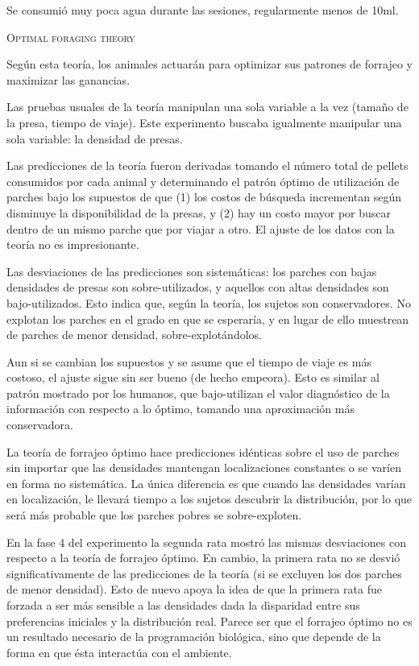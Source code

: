 \documentclass[a4paper,12pt]{article}
\begin{document}
Se consumió muy poca agua durante las sesiones, regularmente menos de 10ml. 

{\scshape Optimal foraging theory}

Según esta teoría, los animales actuarán para optimizar sus patrones de forrajeo y maximizar las ganancias. 

Las pruebas usuales de la teoría manipulan una sola variable a la vez (tamaño de la presa, tiempo de viaje). Este experimento buscaba igualmente manipular una sola variable: la densidad de presas.

Las predicciones de la teoría fueron derivadas tomando el número total de pellets consumidos por cada animal y determinando el patrón óptimo de utilización de parches bajo los supuestos de que (1) los costos de búsqueda incrementan según disminuye la disponibilidad de la presas, y (2) hay un costo mayor por buscar dentro de un mismo parche que por viajar a otro. El ajuste de los datos con la teoría no es impresionante.

Las desviaciones de las predicciones son sistemáticas: los parches con bajas densidades de presas son sobre-utilizados, y aquellos con altas densidades son bajo-utilizados. Esto indica que, según la teoría, los sujetos son conservadores. No explotan los parches en el grado en que se esperaría, y en lugar de ello muestrean de parches de menor densidad, sobre-explotándolos. 

Aun si se cambian los supuestos y se asume que el tiempo de viaje es más costoso, el ajuste sigue sin ser bueno (de hecho empeora). Esto es similar al patrón mostrado por los humanos, que bajo-utilizan el valor diagnóstico de la información con respecto a lo óptimo,  tomando una aproximación más conservadora.

La teoría de forrajeo óptimo hace predicciones idénticas sobre el uso de parches sin importar que las densidades mantengan localizaciones constantes o se varíen en forma no sistemática. La única diferencia es que cuando las densidades varían en localización, le llevará tiempo a los sujetos descubrir la distribución, por lo que será más probable que los parches pobres se sobre-exploten.

En la fase 4 del experimento la segunda rata mostró las mismas desviaciones con respecto a la teoría de forrajeo óptimo. En cambio, la primera rata no se desvió significativamente de las predicciones de la teoría (si se excluyen los dos parches de menor densidad). Esto de nuevo apoya la idea de que la primera rata fue forzada a ser más sensible a las densidades dada la disparidad entre sus preferencias iniciales y la distribución real. Parece ser que el forrajeo óptimo no es un resultado necesario de la programación biológica, sino que depende de la forma en que ésta interactúa con el ambiente.
\end{document}
